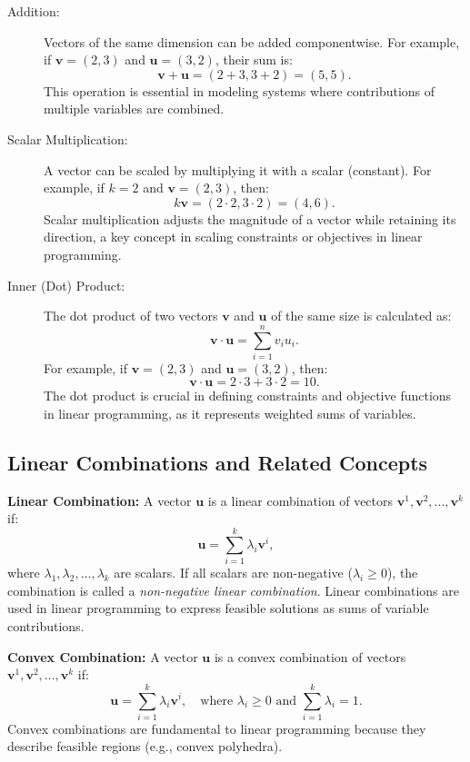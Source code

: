 \begin{description}
    \item[Addition:]  
    Vectors of the same dimension can be added componentwise. For example, if \(\mathbf{v} = (2, 3)\) and \(\mathbf{u} = (3, 2)\), their sum is:  
    \[
    \mathbf{v} + \mathbf{u} = (2+3, 3+2) = (5, 5).
    \]  
    This operation is essential in modeling systems where contributions of multiple variables are combined.

    \item[Scalar Multiplication:]  
    A vector can be scaled by multiplying it with a scalar (constant). For example, if \(k = 2\) and \(\mathbf{v} = (2, 3)\), then:
    \[
    k\mathbf{v} = (2 \cdot 2, 3 \cdot 2) = (4, 6).
    \]  
    Scalar multiplication adjusts the magnitude of a vector while retaining its direction, a key concept in scaling constraints or objectives in linear programming.

    \item[Inner (Dot) Product:]  
    The dot product of two vectors \(\mathbf{v}\) and \(\mathbf{u}\) of the same size is calculated as:
    \[
    \mathbf{v} \cdot \mathbf{u} = \sum_{i=1}^n v_i u_i.
    \]  
    For example, if \(\mathbf{v} = (2, 3)\) and \(\mathbf{u} = (3, 2)\), then:
    \[
    \mathbf{v} \cdot \mathbf{u} = 2 \cdot 3 + 3 \cdot 2 = 10.
    \]  
    The dot product is crucial in defining constraints and objective functions in linear programming, as it represents weighted sums of variables.
\end{description}

\subsection{Linear Combinations and Related Concepts}

\textbf{Linear Combination:}  
A vector \(\mathbf{u}\) is a linear combination of vectors \(\mathbf{v}^1, \mathbf{v}^2, \dots, \mathbf{v}^k\) if:
\[
\mathbf{u} = \sum_{i=1}^k \lambda_i \mathbf{v}^i,
\]
where \(\lambda_1, \lambda_2, \dots, \lambda_k\) are scalars. If all scalars are non-negative (\(\lambda_i \geq 0\)), the combination is called a \emph{non-negative linear combination}. Linear combinations are used in linear programming to express feasible solutions as sums of variable contributions.

\medskip  
\textbf{Convex Combination:}  
A vector \(\mathbf{u}\) is a convex combination of vectors \(\mathbf{v}^1, \mathbf{v}^2, \dots, \mathbf{v}^k\) if:
\[
\mathbf{u} = \sum_{i=1}^k \lambda_i \mathbf{v}^i, \quad \text{where } \lambda_i \geq 0 \text{ and } \sum_{i=1}^k \lambda_i = 1.
\]
Convex combinations are fundamental to linear programming because they describe feasible regions (e.g., convex polyhedra).

